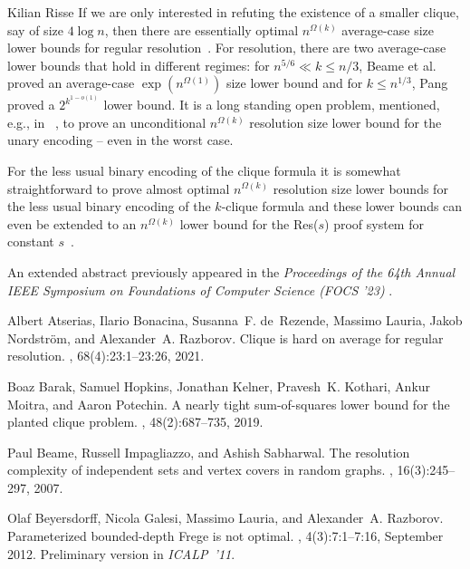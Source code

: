 \documentclass[report]{owrart}
\begin{document}
\begin{report}
\begin{talk}{Kilian Risse}
  If we are only interested in refuting the existence of a smaller
  clique, say of size $4 \log n$, then there are essentially optimal
  $n^{\Omega(k)}$ average-case size lower bounds for regular
  resolution~\cite{ABRLNR21,Pang21}. For resolution, there are two
  average-case lower bounds that hold in different regimes: for
  $n^{5/6} \ll k \le n/3$, Beame et al.~\cite{BIS07} proved an
  average-case $\exp(n^{\Omega(1)})$ size lower bound and for
  $k\leq n^{1/3}$, Pang~\cite{Pang21} proved a $2^{k^{1-o(1)}}$ lower
  bound.  It is a long standing open problem, mentioned, e.g., in
  ~\cite{BGLR12Parameterized}, to prove an unconditional $n^{\Omega(k)}$
  resolution size lower bound for the unary encoding -- even in the
  worst case.
  
  For the less usual binary encoding of the clique formula it is
  somewhat straightforward to prove almost optimal $n^{\Omega(k)}$
  resolution size lower bounds for the less usual binary encoding of the
  $k$-clique formula \cite{LPRT17ComplexityRamsey} and these lower
  bounds can even be extended to an $n^{\Omega(k)}$ lower bound for the
  Res($s$) proof system for constant $s$~\cite{DGGM20}.
  
  An extended abstract previously appeared in the \emph{Proceedings of
    the 64th Annual IEEE Symposium on Foundations of Computer Science
    (FOCS '23)} \cite{DPR23}.
    
    \begin{thebibliography}{99}
    
      Albert Atserias, Ilario Bonacina, Susanna~F. de~Rezende, Massimo Lauria, Jakob
        Nordstr{\"{o}}m, and Alexander~A. Razborov.
      \newblock Clique is hard on average for regular resolution.
      , 68(4):23:1--23:26, 2021.
      
      Boaz Barak, Samuel Hopkins, Jonathan Kelner, Pravesh~K. Kothari, Ankur Moitra,
        and Aaron Potechin.
      \newblock A nearly tight sum-of-squares lower bound for the planted clique
        problem.
      , 48(2):687--735, 2019.
      
      Paul Beame, Russell Impagliazzo, and Ashish Sabharwal.
      \newblock The resolution complexity of independent sets and vertex covers in
        random graphs.
      , 16(3):245--297, 2007.
      
      Olaf Beyersdorff, Nicola Galesi, Massimo Lauria, and Alexander~A. Razborov.
      \newblock Parameterized bounded-depth {F}rege is not optimal.
      , 4(3):7:1--7:16,
        September 2012.
      \newblock Preliminary version in \emph{ICALP~'11}.
      

\end{thebibliography}
\end{talk}
\end{report}
\end{document}

